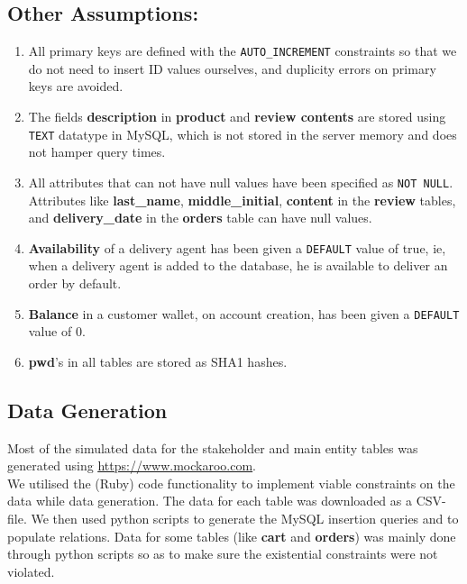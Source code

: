 \documentclass[12pt]{report}
\begin{document}
    \subsection*{Other Assumptions:}
    \begin{enumerate}
        \item
        All primary keys are defined with the \verb|AUTO_INCREMENT| constraints so that we do not need to insert ID values ourselves, and duplicity errors on primary keys are avoided.
        \item
        The fields \textbf{description} in \textbf{product} and \textbf{review contents} are stored using \verb|TEXT| datatype in MySQL, which is not stored in the server memory and does not hamper query times.
        \item
        All attributes that can not have null values have been specified as \verb|NOT NULL|. Attributes like \textbf{last\_name}, \textbf{middle\_initial}, \textbf{content} in the \textbf{review} tables, and \textbf{delivery\_date} in the \textbf{orders} table can have null values.
        \item
        \textbf{Availability} of a delivery agent has been given a \verb|DEFAULT| value of true, ie, when a delivery agent is added to the database, he is available to deliver an order by default.
        \item
        \textbf{Balance} in a customer wallet, on account creation, has been given a \verb|DEFAULT| value of 0.
        \item
        \textbf{pwd}'s in all tables are stored as SHA1 hashes.
    \end{enumerate}

    \subsection*{Data Generation}
    Most of the simulated data for the stakeholder and main entity tables was generated using \href{https://www.mockaroo.com}{\color{blue}\underline{https://www.mockaroo.com}}. \\
    \newline
    We utilised the (Ruby) code functionality to implement viable constraints on the data while data generation.
    The data for each table was downloaded as a CSV-file.
    We then used python scripts to generate the MySQL insertion queries and to populate relations.
    Data for some tables (like \textbf{cart} and \textbf{orders}) was mainly done through python scripts so as to make sure the existential constraints were not violated.
\end{document}
